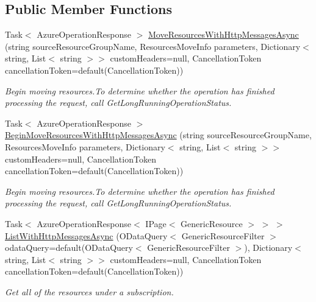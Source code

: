 \subsection*{Public Member Functions}
\begin{DoxyCompactItemize}
\item 
Task$<$ Azure\+Operation\+Response $>$ \hyperlink{interface_microsoft_1_1_azure_1_1_management_1_1_resources_1_1_i_resources_operations_ab3647d8555b725c25a5bdb5c20eb2c99}{Move\+Resources\+With\+Http\+Messages\+Async} (string source\+Resource\+Group\+Name, Resources\+Move\+Info parameters, Dictionary$<$ string, List$<$ string $>$$>$ custom\+Headers=null, Cancellation\+Token cancellation\+Token=default(Cancellation\+Token))
\begin{DoxyCompactList}\small\item\em Begin moving resources.\+To determine whether the operation has finished processing the request, call Get\+Long\+Running\+Operation\+Status. \end{DoxyCompactList}\item 
Task$<$ Azure\+Operation\+Response $>$ \hyperlink{interface_microsoft_1_1_azure_1_1_management_1_1_resources_1_1_i_resources_operations_a91f9b53e79a6400d10ef279b05626142}{Begin\+Move\+Resources\+With\+Http\+Messages\+Async} (string source\+Resource\+Group\+Name, Resources\+Move\+Info parameters, Dictionary$<$ string, List$<$ string $>$$>$ custom\+Headers=null, Cancellation\+Token cancellation\+Token=default(Cancellation\+Token))
\begin{DoxyCompactList}\small\item\em Begin moving resources.\+To determine whether the operation has finished processing the request, call Get\+Long\+Running\+Operation\+Status. \end{DoxyCompactList}\item 
Task$<$ Azure\+Operation\+Response$<$ I\+Page$<$ Generic\+Resource $>$ $>$ $>$ \hyperlink{interface_microsoft_1_1_azure_1_1_management_1_1_resources_1_1_i_resources_operations_a579be7fe62d7be2d7d8515937b4e79f9}{List\+With\+Http\+Messages\+Async} (O\+Data\+Query$<$ Generic\+Resource\+Filter $>$ odata\+Query=default(O\+Data\+Query$<$ Generic\+Resource\+Filter $>$), Dictionary$<$ string, List$<$ string $>$$>$ custom\+Headers=null, Cancellation\+Token cancellation\+Token=default(Cancellation\+Token))
\begin{DoxyCompactList}\small\item\em Get all of the resources under a subscription. \end{DoxyCompactList}\item 
$$
\end{DoxyCompactItemize}
